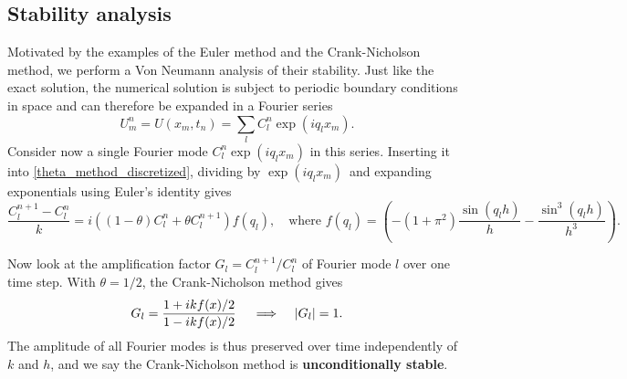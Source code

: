 \subsection{Stability analysis}

Motivated by the examples of the Euler method and the Crank-Nicholson method, we perform a Von Neumann analysis of their stability.
Just like the exact solution, the numerical solution is subject to periodic boundary conditions in space and can therefore be expanded in a Fourier series
\begin{equation}
	U_m^n = U(x_m, t_n) = \sum_l C_l^n \exp \left(i q_l x_m\right).
\end{equation}
Consider now a single Fourier mode $C_l^n \exp (i q_l x_m)$ in this series.
Inserting it into \cref{theta_method_discretized}, dividing by $\exp(i q_l x_m)$ and expanding exponentials using Euler's identity gives
\begin{equation*}
\frac{C_l^{n+1}-C_l^n}{k} = i \left(\left(1-\theta\right)C_l^n+\theta C_l^{n+1}\right) f(q_l) , \quad \text{where} \,\, f(q_l) = \left(-\left(1+\pi^2\right) \frac{\sin(q_l h)}{h} - \frac{\sin^3(q_l h)}{h^3}\right).
\end{equation*}

Now look at the amplification factor $G_l = C_l^{n+1} / C_l^n$ of Fourier mode $l$ over one time step. 
With $\theta = 1/2$, the Crank-Nicholson method gives 
\begin{equation}
	G_l = \frac{1 + i k f(x) / 2}{1 - i k f(x) / 2} \quad \implies \quad \abs{G_l} = 1.
	\label{crank_nicholson_amplification_factor}
\end{equation}
The amplitude of all Fourier modes is thus preserved over time independently of $k$ and $h$, and we say the Crank-Nicholson method is \textbf{unconditionally stable}.

